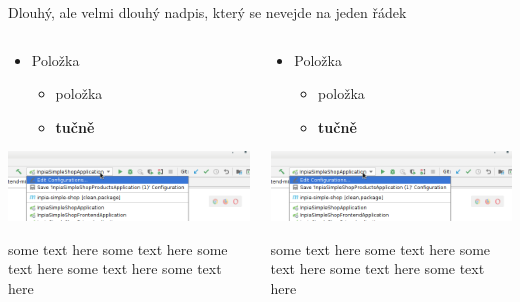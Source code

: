 \documentclass{beamer}							%
\begin{document}
\begin{frame}[fragile, shrink=20]{Dlouhý, ale velmi dlouhý nadpis, který se nevejde na jeden řádek}


\begin{columns}
	\begin{column}{0.5\textwidth}
		\begin{itemize}
			\item Položka
			\begin{itemize}
				\item položka
				\item \textbf{tučně}
			\end{itemize}
		\end{itemize}
		\includegraphics[width=\linewidth]{images/idea-app-configuration.png}

		some text here some text here some text here some text here some text here
	\end{column}
	\begin{column}{0.5\textwidth}
		\begin{center}
			\begin{itemize}
				\item Položka
				\begin{itemize}
					\item položka
					\item \textbf{tučně}
				\end{itemize}
			\end{itemize}

			\includegraphics[width=\linewidth]{images/idea-app-configuration.png}

			some text here some text here some text here some text here some text here
		\end{center}
	\end{column}
\end{columns}


\end{frame}
\end{document}
